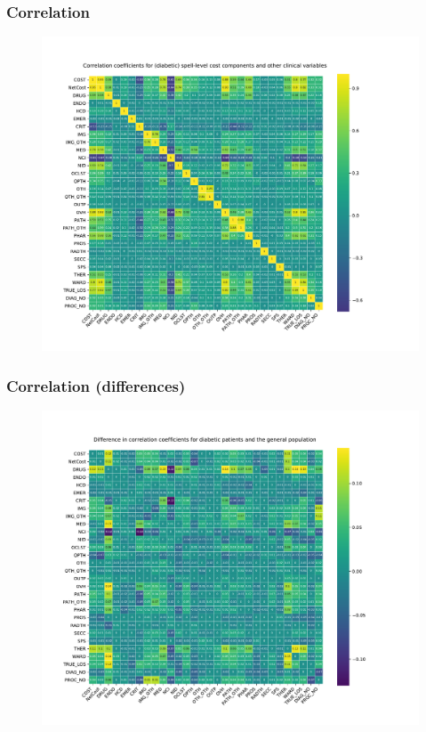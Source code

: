 \documentclass{beamer}
\begin{document}
\begin{frame}
    \frametitle{Correlation}

    \vspace{-15pt}
    \begin{figure}
    \includegraphics[width=\linewidth]{./img/diabetic_corr_heatmap.pdf}
    \end{figure}
\end{frame}

\begin{frame}
    \frametitle{Correlation (differences)}

    \vspace{-15pt}
    \begin{figure}
    \includegraphics[width=\linewidth]{./img/differences_corr_heatmap.pdf}
    \end{figure}
\end{frame}
\end{document}
